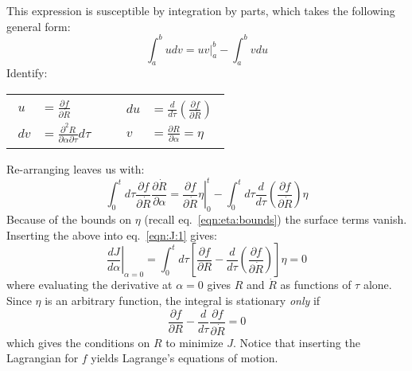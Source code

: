 \documentclass[letter,11pt]{article}
\newcommand{\laeq}[1]{\label{eqn:#1}}
\newcommand{\refeq}[1]{eq.~\ref{eqn:#1}}
\begin{document}
This expression is susceptible by integration by parts, which takes the following general form:
\begin{equation*}
  \int_a^b u dv = {\left. uv \right|}_a^b - \int_a^b v du
\end{equation*}
Identify:
\begin{center}
  \vspace{-\baselineskip}
  \begin{tabular}{c c c}
    $\begin{aligned}
      u  &= \frac{\partial f}{\partial \dot{R}} \\
      dv &= \frac{\partial^2 R}{\partial \alpha \partial \tau} d\tau
    \end{aligned}$
& \hspace{3em} &
    $\begin{aligned}
      du &= \frac{d}{d\tau} \left( \frac{\partial f}{\partial \dot{R}} \right) \\
      v  &= \frac{\partial R}{\partial \alpha}=\eta 
    \end{aligned}$
  \end{tabular}
\end{center}
Re-arranging leaves us with:
\begin{equation*}
  \int_{0}^{t}d\tau\frac{\partial f}{\partial \dot{R}}\frac{\partial \dot{R}}{\partial \alpha} = {\left. \frac{\partial f}{\partial \dot{R}} \eta \right|}_0^t - \int_{0}^{t}d\tau \frac{d}{d\tau} \left( \frac{\partial f}{\partial \dot{R}} \right) \eta
\end{equation*}
Because of the bounds on $\eta$ (recall \refeq{eta:bounds}) the surface terms vanish. Inserting the above into \refeq{J:1} gives:
\begin{equation}\laeq{J:2}
  {\left. \frac{d J}{d \alpha} \right|}_{\alpha=0} = 
  \int_{0}^{t}d\tau \left[ \frac{\partial f}{\partial R} - \frac{d}{d\tau} \left( \frac{\partial f}{\partial \dot{R}} \right) \right] \eta = 0
\end{equation}
where evaluating the derivative at $\alpha=0$ gives $R$ and $\dot{R}$ as functions of $\tau$ alone. Since $\eta$ is an arbitrary function, the integral is stationary \emph{only} if
\begin{equation}\laeq{G2-11}
  \frac{\partial f}{\partial R} - \frac{d}{d\tau}\frac{\partial f}{\partial\dot{R}}  = 0
\end{equation}
which gives the conditions on $R$ to minimize $J$. Notice that inserting the Lagrangian for $f$ yields Lagrange's equations of motion.
\end{document}

